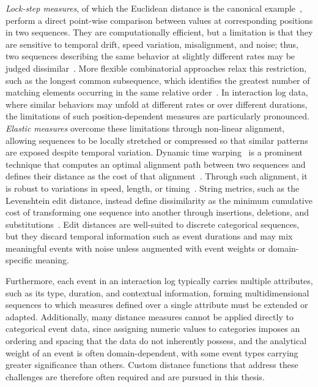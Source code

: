 \textit{Lock-step measures}, of which the Euclidean distance is the canonical example~\cite{faloutsos1994fast}, perform a direct point-wise comparison between values at corresponding positions in two sequences.
They are computationally efficient, but a limitation is that they are sensitive to temporal drift, speed variation, misalignment, and noise; thus, two sequences describing the same behavior at slightly different rates may be judged dissimilar~\cite{ratanamahatana2005novel}.
More flexible combinatorial approaches relax this restriction, such as the longest common subsequence, which identifies the greatest number of matching elements occurring in the same relative order~\cite{bergroth2000survey}.
In interaction log data, where similar behaviors may unfold at different rates or over different durations, the limitations of such position-dependent measures are particularly pronounced.
\textit{Elastic measures} overcome these limitations through non-linear alignment, allowing sequences to be locally stretched or compressed so that similar patterns are exposed despite temporal variation.
Dynamic time warping~\cite{berndt1994using} is a prominent technique that computes an optimal alignment path between two sequences and defines their distance as the cost of that alignment~\cite{keogh2005clustering, aghabozorgi2015time}.
Through such alignment, it is robust to variations in speed, length, or timing~\cite{aghabozorgi2015time}.
String metrics, such as the Levenshtein edit distance, instead define dissimilarity as the minimum cumulative cost of transforming one sequence into another through insertions, deletions, and substitutions~\cite{levenshtein1966binary}.
Edit distances are well-suited to discrete categorical sequences, but they discard temporal information such as event durations and may mix meaningful events with noise unless augmented with event weights or domain-specific meaning.

Furthermore, each event in an interaction log typically carries multiple attributes, such as its type, duration, and contextual information, forming multidimensional sequences to which measures defined over a single attribute must be extended or adapted.
Additionally, many distance measures cannot be applied directly to categorical event data, since assigning numeric values to categories imposes an ordering and spacing that the data do not inherently possess, and the analytical weight of an event is often domain-dependent, with some event types carrying greater significance than others.
Custom distance functions that address these challenges are therefore often required and are pursued in this thesis.

